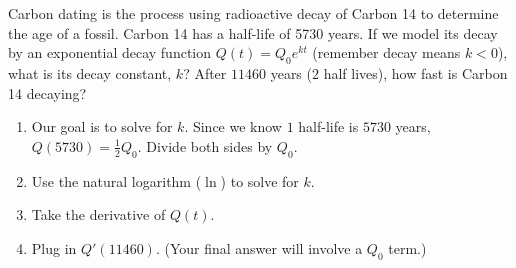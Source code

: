 \documentclass[12pt, a4paper]{article}
\begin{document}
\begin{ex}
  Carbon dating is the process using radioactive decay of Carbon 14 to
  determine the age of a fossil. Carbon 14 has a half-life of 5730
  years. If we model its decay by an exponential decay function \(Q(t)
  = Q_0 e^{kt}\) (remember decay means \(k < 0\)), what is its decay constant, \(k\)? After \(11460\)
  years (\(2\) half lives), how fast is Carbon 14 decaying?
  \begin{enumerate}
  \item Our goal is to solve for \(k\). Since we know \(1\) half-life
    is \(5730\) years, \(Q(5730) =
    \frac{1}{2}Q_0\). Divide both sides by \(Q_0\).
    \vspace{0.75in}
  \item Use the natural logarithm (\(\ln\)) to solve for \(k\).
    \vspace{0.75in}
  \item Take the derivative of \(Q(t)\).
    \vspace{0.75in}
  \item Plug in \(Q'(11460)\). (Your final answer will involve a
    \(Q_0\) term.)
  \end{enumerate}
\end{ex}
\vspace{-2in}
\end{document}
